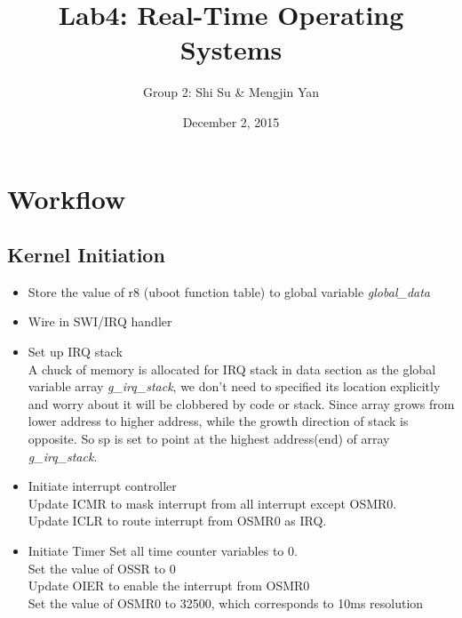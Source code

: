 \documentclass{article}
\title{\bf{ Lab4: Real-Time Operating Systems} }
\author{Group 2: Shi Su \& Mengjin Yan}
\date{December 2, 2015}
\begin{document}
 
\maketitle
 
\tableofcontents

\newpage


% 
  

\section{Workflow}
\subsection{Kernel Initiation}
\begin{itemize}
	\setlength{\itemsep}{1pt}
	\setlength{\parskip}{0pt}
	\setlength{\parsep}{0pt}
	\item Store the value of r8 (uboot function table) to global variable {\it global\_data}
	\item Wire in SWI/IRQ handler
	\item Set up IRQ stack\\
		A chuck of memory is allocated for IRQ stack in data section as the global variable array {\it g\_irq\_stack}, we don't need to specified its location explicitly and worry about it will be clobbered by code or stack. Since array grows from lower address to higher address, while the growth direction of stack is opposite. So sp is set to point at the highest address(end) of array {\it g\_irq\_stack}. \\
	\item Initiate interrupt controller\\
		Update ICMR to mask interrupt from all interrupt except OSMR0.\\
		Update ICLR to route interrupt from OSMR0 as IRQ.\\
	\item Initiate Timer
		Set all time counter variables to 0.\\
		Set the value of OSSR to 0\\
		Update OIER to enable the interrupt from OSMR0\\
		Set the value of OSMR0 to 32500, which corresponds to 10ms resolution\\
\end{itemize}
\end{document}
